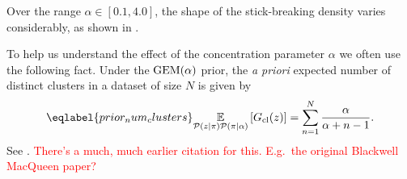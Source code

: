 Over the range $\alpha\in[0.1, 4.0]$, the shape of
the stick-breaking density varies considerably, as shown in
.

\BetaPriorsEx

To help us understand the effect of the concentration parameter
$\alpha$ we often use the following fact. Under the $\mathrm{GEM}(\alpha)$ prior, the {\em a priori} expected
number of distinct clusters in a dataset of size $N$ is given by
%
\begin{align}\eqlabel{prior_num_clusters}
\expect{\p(\z \vert \pi)\p(\pi \vert \alpha)}{\nclusters(\z)} =
\sum_{\n = 1}^\N \frac{\alpha}{\alpha + \n - 1}.
\end{align}
%
See \citep[Equation 75]{jordan:2015:gentleintrodp}. \textcolor{red}{There's a much, much earlier citation for this. E.g.\ the original Blackwell MacQueen paper?}
